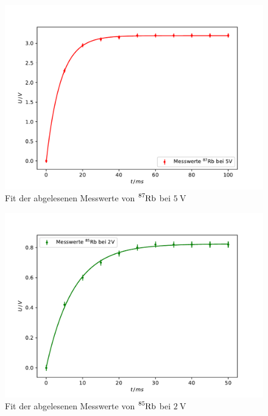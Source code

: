 \begin{figure}
    \centering
        \includegraphics[width=\textwidth]{plots/e87.pdf}
        \caption{Fit der abgelesenen Messwerte von $\ce{^{87}Rb}$ bei $\qty{5}{\volt}$}
    \label{fig:e87}
\end{figure}

\begin{figure}
    \centering
        \includegraphics[width=\textwidth]{plots/e85.pdf}
        \caption{Fit der abgelesenen Messwerte von $\ce{^{85}Rb}$ bei $\qty{2}{\volt}$}
    \label{fig:e85}
\end{figure}